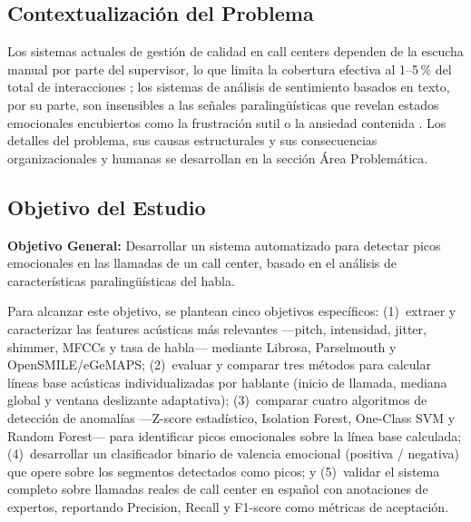 \subsection{Contextualización del Problema}
\label{sec:intro_contexto}

Los sistemas actuales de gestión de calidad en call centers dependen de la escucha
manual por parte del supervisor, lo que limita la cobertura efectiva al 1--5\,\% del
total de interacciones \cite{zoom2025}; los sistemas de análisis de sentimiento basados
en texto, por su parte, son insensibles a las señales paralingüísticas que revelan
estados emocionales encubiertos como la frustración sutil o la ansiedad contenida
\cite{jha2022, feng2023}. Los detalles del problema, sus causas estructurales y sus
consecuencias organizacionales y humanas se desarrollan en la sección Área Problemática.

\subsection{Objetivo del Estudio}
\label{sec:intro_objetivos}

\textbf{Objetivo General:} Desarrollar un sistema automatizado para detectar picos
emocionales en las llamadas de un call center, basado en el análisis de características
paralingüísticas del habla.

Para alcanzar este objetivo, se plantean cinco objetivos específicos: (1)~extraer y
caracterizar las features acústicas más relevantes ---pitch, intensidad, jitter,
shimmer, MFCCs y tasa de habla--- mediante Librosa, Parselmouth y OpenSMILE/eGeMAPS;
(2)~evaluar y comparar tres métodos para calcular líneas base acústicas individualizadas
por hablante (inicio de llamada, mediana global y ventana deslizante adaptativa);
(3)~comparar cuatro algoritmos de detección de anomalías ---Z-score estadístico,
Isolation Forest, One-Class SVM y Random Forest--- para identificar picos emocionales
sobre la línea base calculada; (4)~desarrollar un clasificador binario de valencia
emocional (positiva / negativa) que opere sobre los segmentos detectados como picos;
y (5)~validar el sistema completo sobre llamadas reales de call center en español con
anotaciones de expertos, reportando Precision, Recall y F1-score como métricas de
aceptación.

